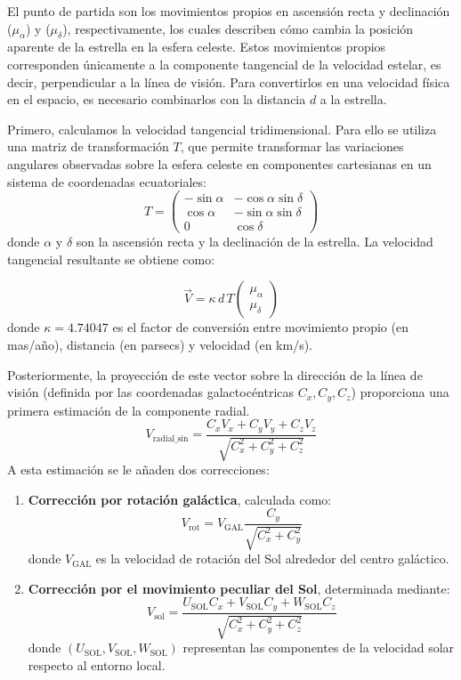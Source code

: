 El punto de partida son los movimientos propios en ascensión recta y declinación (\( \mu_{\alpha} \)) y (\( \mu_{\delta} \)), respectivamente, los cuales describen cómo cambia la posición aparente de la estrella en la esfera celeste.
Estos movimientos propios corresponden únicamente a la componente tangencial de la velocidad estelar, es decir, perpendicular a la línea de visión.
Para convertirlos en una velocidad física en el espacio, es necesario combinarlos con la distancia \( d \) a la estrella.

Primero, calculamos la velocidad tangencial tridimensional.
Para ello se utiliza una matriz de transformación \( T \), que permite transformar las variaciones angulares observadas sobre la esfera celeste en componentes cartesianas en un sistema de coordenadas ecuatoriales:
\[
    T =
    \begin{pmatrix}
        -\sin\alpha & -\cos\alpha \sin\delta \\
        \cos\alpha & -\sin\alpha \sin\delta \\
        0 & \cos\delta
    \end{pmatrix}
\]
donde \(\alpha\) y \(\delta\) son la ascensión recta y la declinación de la estrella.
La velocidad tangencial resultante se obtiene como:

\[
    \vec{V} = \kappa \, d \,
    T
    \begin{pmatrix}
        \mu_{\alpha} \\
        \mu_{\delta}
    \end{pmatrix}
\]
donde \(\kappa = 4.74047\) es el factor de conversión entre movimiento propio (en mas/año), distancia (en parsecs) y velocidad (en km/s).

Posteriormente, la proyección de este vector sobre la dirección de la línea de visión (definida por las coordenadas galactocéntricas \( C_x, C_y, C_z \)) proporciona una primera estimación de la componente radial.
\[
    V_{\text{radial\_sin}} =
    \frac{C_x V_x + C_y V_y + C_z V_z}
    {\sqrt{C_x^2 + C_y^2 + C_z^2}}
\]
A esta estimación se le añaden dos correcciones:

\begin{enumerate}
    \item \textbf{Corrección por rotación galáctica}, calculada como:
    \[
        V_{\text{rot}} = V_{\text{GAL}} \frac{C_y}{\sqrt{C_x^2 + C_y^2}}
    \]
    donde \( V_{\text{GAL}} \) es la velocidad de rotación del Sol alrededor del centro galáctico.

    \item \textbf{Corrección por el movimiento peculiar del Sol}, determinada mediante:
    \[
        V_{\text{sol}} = \frac{U_{\text{SOL}} C_x + V_{\text{SOL}} C_y + W_{\text{SOL}} C_z}{\sqrt{C_x^2 + C_y^2 + C_z^2}}
    \]
    donde \( (U_{\text{SOL}}, V_{\text{SOL}}, W_{\text{SOL}}) \) representan las componentes de la velocidad solar respecto al entorno local.
\end{enumerate}

